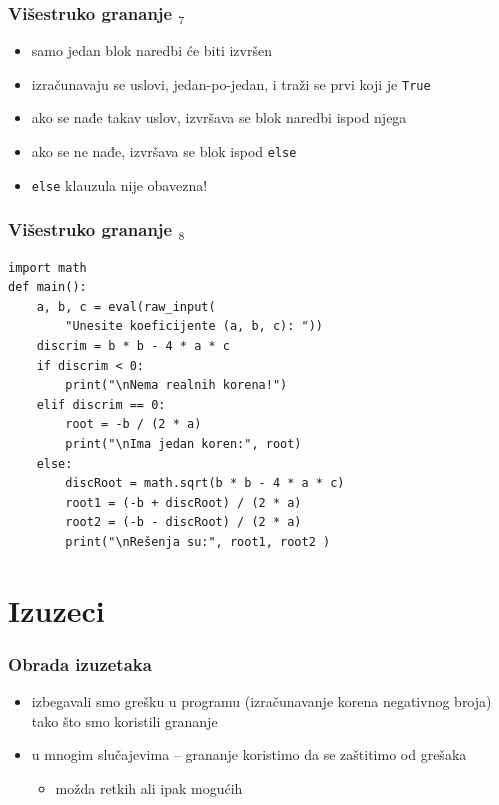 \documentclass[utf8,compress]{beamer}
\begin{document}
\begin{frame}[fragile]
  \frametitle{Višestruko grananje $_7$}
  \begin{itemize}
    \item samo jedan blok naredbi će biti izvršen
    \item izračunavaju se uslovi, jedan-po-jedan, i traži se prvi koji je \texttt{True}
    \item ako se nađe takav uslov, izvršava se blok naredbi ispod njega
    \item ako se ne nađe, izvršava se blok ispod \texttt{else}
    \item \texttt{else} klauzula nije obavezna!
  \end{itemize}
\end{frame}

\begin{frame}[fragile,shrink=5]
  \frametitle{Višestruko grananje $_8$}
\begin{verbatim}
import math 
def main():
    a, b, c = eval(raw_input(
        "Unesite koeficijente (a, b, c): "))
    discrim = b * b - 4 * a * c
    if discrim < 0:
        print("\nNema realnih korena!")
    elif discrim == 0:
        root = -b / (2 * a)
        print("\nIma jedan koren:", root)
    else:
        discRoot = math.sqrt(b * b - 4 * a * c)
        root1 = (-b + discRoot) / (2 * a)
        root2 = (-b - discRoot) / (2 * a)
        print("\nRešenja su:", root1, root2 )
\end{verbatim}
\end{frame}

\section{Izuzeci}

\begin{frame}[fragile]
  \frametitle{Obrada izuzetaka}
  \begin{itemize}
    \item izbegavali smo grešku u programu (izračunavanje korena negativnog broja) tako što smo koristili grananje
    \item u mnogim slučajevima -- grananje koristimo da se zaštitimo od grešaka
    \begin{itemize}
      \item možda retkih ali ipak mogućih
    \end{itemize}
  \end{itemize}
\end{frame}
\end{document}
